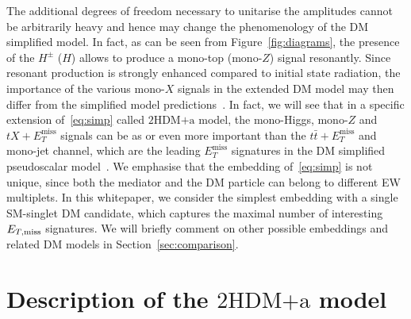 \documentclass[a4paper, 11pt,notoc]{article}
\newcommand{\MET}{\ensuremath{E_T^\mathrm{miss}}\xspace}
\newcommand{\hdma}{\ensuremath{\textrm{2HDM+a}}\xspace}
\begin{document}
The additional degrees of freedom necessary to unitarise the amplitudes cannot be arbitrarily heavy and hence may change the phenomenology of the DM simplified model. In fact, as can be seen from Figure~\ref{fig:diagrams}, the presence of the $H^\pm$ ($H$) allows to produce a mono-top (mono-$Z$)  signal resonantly. Since resonant production is strongly enhanced compared to initial state radiation, the  importance of the various mono-$X$ signals in the extended DM model may then differ from the simplified model predictions~\cite{Goncalves:2016iyg,Bauer:2017ota,Pani:2017qyd}. In fact, we will see that in a specific extension of~\eqref{eq:simp}  called \hdma model, the mono-Higgs, mono-$Z$ and $t X + \MET$ signals can be as or even more important than the $t \bar t + \MET$ and mono-jet channel, which are  the leading $\MET$ signatures in the DM simplified pseudoscalar model~\cite{Haisch:2012kf,Fox:2012ru,Buckley:2014fba,Harris:2014hga,Haisch:2015ioa}. We emphasise that the embedding of~\eqref{eq:simp} is not unique, since  both the mediator and the DM particle can belong to different EW multiplets. In this whitepaper, we consider the simplest embedding with a single SM-singlet DM candidate, which captures the maximal number of interesting $E_{T,\rm miss}$ signatures. We will briefly comment on other possible embeddings and related DM models in Section~\ref{sec:comparison}.  


\section{Description of the \hdma model}
\label{sec:modeldescription}
\end{document}
